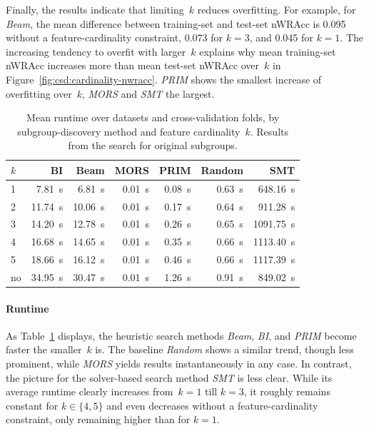 \documentclass{article}
\theoremstyle{definition}
\begin{document}
Finally, the results indicate that limiting~$k$ reduces overfitting.
For example, for \emph{Beam}, the mean difference between training-set and test-set nWRAcc is 0.095 without a feature-cardinality constraint, 0.073 for $k=3$, and 0.045 for $k=1$.
The increasing tendency to overfit with larger~$k$ explains why mean training-set nWRAcc increases more than mean test-set nWRAcc over~$k$ in Figure~\ref{fig:csd:cardinality-nwracc}.
\emph{PRIM} shows the smallest increase of overfitting over~$k$, \emph{MORS} and \emph{SMT} the largest.

\begin{table}[t]
	\centering
	\begin{tabular}{lrrrrrr}
		\toprule
		$k$ & BI & Beam & MORS & PRIM & Random & SMT \\
		\midrule
		1 & 7.81~s & 6.81~s & 0.01~s & 0.08~s & 0.63~s & 648.16~s \\
		2 & 11.74~s & 10.06~s & 0.01~s & 0.17~s & 0.64~s & 911.28~s \\
		3 & 14.20~s & 12.78~s & 0.01~s & 0.26~s & 0.65~s & 1091.75~s \\
		4 & 16.68~s & 14.65~s & 0.01~s & 0.35~s & 0.66~s & 1113.40~s \\
		5 & 18.66~s & 16.12~s & 0.01~s & 0.46~s & 0.66~s & 1117.39~s \\
		no & 34.95~s & 30.47~s & 0.01~s & 1.26~s & 0.91~s & 849.02~s \\
		\bottomrule
	\end{tabular}
	\caption{
		Mean runtime over datasets and cross-validation folds, by subgroup-discovery method and feature cardinality~$k$.
		Results from the search for original subgroups.
	}
	\label{tab:csd:cardinality-runtime}
\end{table}

\paragraph{Runtime}

As Table~\ref{tab:csd:cardinality-runtime} displays, the heuristic search methods \emph{Beam}, \emph{BI}, and \emph{PRIM} become faster the smaller~$k$ is.
The baseline \emph{Random} shows a similar trend, though less prominent, while \emph{MORS} yields results instantaneously in any case.
In contrast, the picture for the solver-based search method \emph{SMT} is less clear.
While its average runtime clearly increases from~$k=1$ till $k=3$, it roughly remains constant for $k \in \{4, 5\}$ and even decreases without a feature-cardinality constraint, only remaining higher than for $k = 1$.
\end{document}
